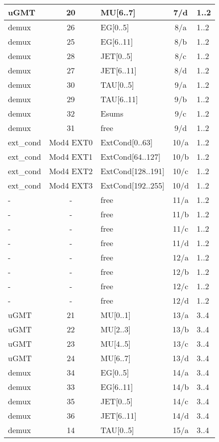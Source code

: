 \begin{longtable}{|l|c|l|c|l|}
uGMT  & 20  & MU[6..7]   & 7/d  & 1..2 \\\hline
demux & 26  & EG[0..5]   & 8/a  & 1..2 \\\hline
demux & 25  & EG[6..11]  & 8/b  & 1..2 \\\hline
demux & 28  & JET[0..5]  & 8/c  & 1..2 \\\hline
demux & 27  & JET[6..11] & 8/d  & 1..2 \\\hline
demux & 30  & TAU[0..5]  & 9/a  & 1..2 \\\hline
demux & 29  & TAU[6..11] & 9/b  & 1..2 \\\hline
demux & 32  & Esums      & 9/c  & 1..2 \\\hline
demux & 31  & free       & 9/d  & 1..2 \\\hline
ext\_cond & Mod4 EXT0 & ExtCond[0..63]    & 10/a & 1..2 \\\hline
ext\_cond & Mod4 EXT1 & ExtCond[64..127]  & 10/b & 1..2 \\\hline
ext\_cond & Mod4 EXT2 & ExtCond[128..191] & 10/c & 1..2 \\\hline
ext\_cond & Mod4 EXT3 & ExtCond[192..255] & 10/d & 1..2 \\\hline
- & - & free & 11/a & 1..2 \\\hline
- & - & free & 11/b & 1..2 \\\hline
- & - & free & 11/c & 1..2 \\\hline
- & - & free & 11/d & 1..2 \\\hline
- & - & free & 12/a & 1..2 \\\hline
- & - & free & 12/b & 1..2 \\\hline
- & - & free & 12/c & 1..2 \\\hline
- & - & free & 12/d & 1..2 \\\hline
\hline
uGMT  & 21  & MU[0..1]   & 13/a & 3..4 \\\hline
uGMT  & 22  & MU[2..3]   & 13/b & 3..4 \\\hline
uGMT  & 23  & MU[4..5]   & 13/c & 3..4 \\\hline
uGMT  & 24  & MU[6..7]   & 13/d & 3..4 \\\hline
demux & 34  & EG[0..5]   & 14/a & 3..4 \\\hline
demux & 33  & EG[6..11]  & 14/b & 3..4 \\\hline
demux & 35  & JET[0..5]  & 14/c & 3..4 \\\hline
demux & 36  & JET[6..11] & 14/d & 3..4 \\\hline
demux & 14  & TAU[0..5]  & 15/a & 3..4 \\\hline

\end{longtable}
